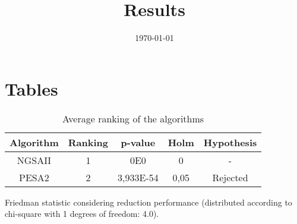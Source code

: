 \documentclass{article}
\title{Results}
\author{}
\date{\today}
\begin{document}
\oddsidemargin 0in \topmargin 0in\maketitle

\section{Tables}
\begin{table}[!htp]
\centering
\begin{tabular}{c|c|c|c|c}
Algorithm&Ranking&p-value&Holm&Hypothesis\\
\hline
NGSAII & 1 & 0E0 & 0 & -\\
PESA2 & 2 & 3,933E-54 & 0,05 & Rejected\\
\end{tabular}
\caption{Average ranking of the algorithms}
\end{table}


Friedman statistic considering reduction performance (distributed according to chi-square with 1 degrees of freedom: 4.0).
\end{document}
